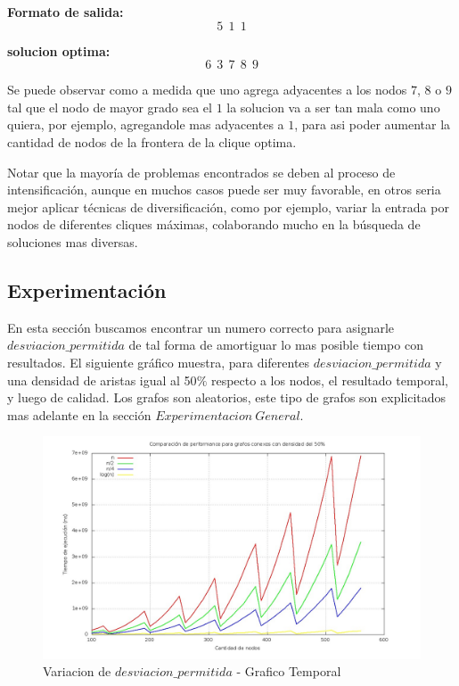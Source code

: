 \textbf{Formato de salida:}
$$5\ \   1\ \   1$$

\textbf{solucion optima:}
 $$6\ \   3\ \   7\ \   8\ \   9$$\newline

Se puede observar como a medida que uno agrega adyacentes a los nodos $7$, $8$ o $9$ tal que el nodo de mayor grado sea el $1$ la solucion va a ser tan mala como uno quiera, por ejemplo, agregandole mas adyacentes a $1$, para asi poder aumentar la cantidad de nodos de la frontera de la clique optima. \newline

Notar que la mayoría de problemas encontrados se deben al proceso de intensificación, aunque en muchos casos puede ser muy favorable, en otros seria mejor aplicar técnicas de diversificación, como por ejemplo, variar la entrada por nodos de diferentes cliques máximas, colaborando mucho en la búsqueda de soluciones mas diversas.

\subsection{Experimentación}

 En esta sección buscamos encontrar un numero correcto para asignarle $desviacion\_permitida$ de tal forma de amortiguar lo mas posible tiempo con resultados. \newline
 El siguiente gráfico muestra, para diferentes $desviacion\_permitida$ y una densidad de aristas igual al 50$\%$ respecto a los nodos, el resultado temporal, y luego de calidad. Los grafos son aleatorios, este tipo de grafos son explicitados mas adelante en la sección $Experimentacion\ General$.


\begin{figure}[H] %
\begin{center}
\includegraphics[width=400pt]{../imgs/variaciontemporal_tabu.jpg}
\caption{Variacion de $desviacion\_permitida$ - Grafico Temporal}
\end{center}
\end{figure}

